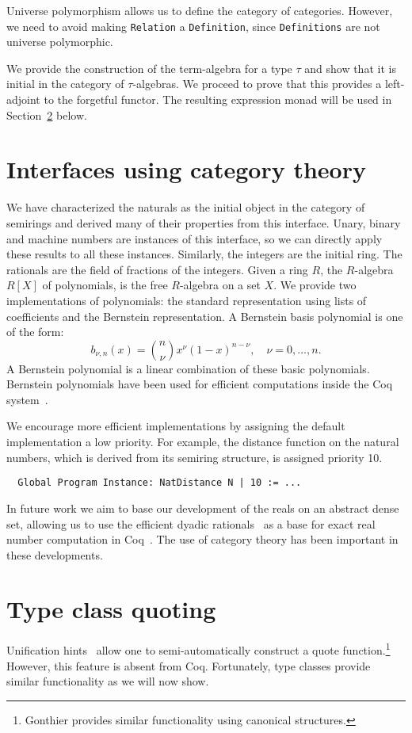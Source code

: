 \documentclass[a4paper,10pt,runningheads]{llncs}
\begin{document}
Universe polymorphism allows us to define the category of categories. However, we need to avoid
making \lstinline|Relation| a \lstinline|Definition|, since \lstinline|Definitions| are not universe polymorphic.

We provide the construction of the term-algebra for a type $\tau$ and show that it is
initial in the category of $\tau$-algebras. We proceed to prove that this provides a left-adjoint
to the forgetful functor. The resulting expression monad will be used in Section~\ref{quote} below.

\section{Interfaces using category theory}\label{interfaces}\label{modul}
We have characterized the naturals as the initial object in the category of semirings and derived
many of their properties from this interface. Unary, binary and machine numbers are
instances of this interface, so we can directly apply these results to all these instances.
Similarly, the integers are the initial ring. The rationals are the field of fractions of the
integers. 
Given a ring $R$, the $R$-algebra $R[X]$ of polynomials, is the free $R$-algebra on a set $X$.
We provide two implementations of polynomials: the
standard representation using lists of coefficients and the Bernstein representation. A Bernstein
basis polynomial is one of the form:
\[b_{\nu,n}(x) = {n \choose \nu} x^{\nu} \left( 1 - x \right)^{n - \nu}, \quad \nu = 0, \ldots, n.\]
A Bernstein polynomial is a linear combination of these basic polynomials. Bernstein polynomials
have been used for efficient computations inside the Coq system~\cite{ZumkellerPhD}.

We encourage more efficient implementations by assigning the default implementation a
low priority. For example, the distance function on the natural numbers, which is derived from its
semiring structure, is assigned priority 10.
\begin{lstlisting}
  Global Program Instance: NatDistance N | 10 := ...
\end{lstlisting}

In future work we aim to base our development of the reals
on an abstract dense set, allowing us to use the efficient dyadic
rationals~\cite{boldo2009combining} as a base for exact real number computation in
Coq~\cite{Riemann,Oconnor:real}. The use of category theory has been important in these developments.

\section{Type class quoting}\label{quote}
Unification hints~\cite{Hints} allow one to semi-automatically construct a quote
function.\footnote{Gonthier provides similar functionality using canonical structures.} However,
this feature is absent from Coq. Fortunately, type classes provide similar functionality as
we will now show.
\end{document}
